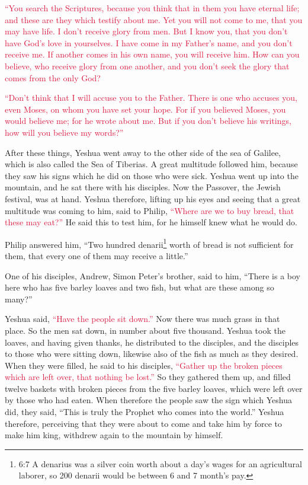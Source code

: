 \myverse{}\textcolor{crimson}{“You search the Scriptures, because you think that in them
	you have eternal life; and these are they which testify about me.
}
\myverse{}\textcolor{crimson}{Yet you will not come to me, that you may have life.
}
\myverse{}\textcolor{crimson}{I don’t receive glory from men.
}
\myverse{}\textcolor{crimson}{But I know you, that you don’t have God’s love in yourselves.
}
\myverse{}\textcolor{crimson}{I have come in my Father’s name, and you don’t receive me. If another
	comes in his own name, you will receive him.
}
\myverse{}\textcolor{crimson}{How can you believe, who receive glory from one another, and you don’t
	seek the glory that comes from the only God?}

\myverse{}\textcolor{crimson}{“Don’t think that I will accuse you to the Father. There
	is one who accuses you, even Moses, on whom you have set your hope.
}
\myverse{}\textcolor{crimson}{For if you believed Moses, you would believe me; for he wrote about me.
}
\myverse{}\textcolor{crimson}{But if you don’t believe his writings, how will you believe my words?”}


\mychapter{} \myverse*{}After these things, Yeshua went away to the other side of the sea
of Galilee, which is also called the Sea of Tiberias.
\myverse{}A great multitude followed him, because they saw his signs which he did on those
who were sick.
\myverse{}Yeshua went up into the mountain, and he sat there with his disciples.
\myverse{}Now the Passover, the Jewish festival, was at hand.
\myverse{}Yeshua therefore, lifting up his eyes and seeing that a great multitude was
coming to him, said to Philip,
\textcolor{crimson}{“Where are we to buy bread, that these may eat?”}
\myverse{}He said this to test him, for he himself knew what he would do.

\myverse{}Philip answered him, “Two hundred denarii\footnote{6:7 A denarius was a silver coin worth about a day’s wages for an agricultural laborer, so 200 denarii
	would be between 6 and 7 month’s pay.} worth of bread is not sufficient for them, that every one
of them may receive a little.”

\myverse{}One of his disciples, Andrew, Simon Peter’s brother, said to him,
\myverse{}“There is a boy here who has five barley loaves and two fish, but what are these
among so many?”

\myverse{}Yeshua said,
\textcolor{crimson}{“Have the people sit down.”} Now there was much grass in that place. So the men sat down, in number
about five thousand.
\myverse{}Yeshua took the loaves, and having given thanks, he distributed to the disciples,
and the disciples to those who were sitting down, likewise also of the fish as much as they desired.
\myverse{}When they were filled, he said to his disciples,
\textcolor{crimson}{“Gather up the broken pieces which are left over, that nothing be lost.”}
\myverse{}So they gathered them up, and filled twelve baskets with broken pieces from
the five barley loaves, which were left over by those who had eaten.
\myverse{}When therefore the people saw the sign which Yeshua did, they said, “This
is truly the Prophet who comes into the world.”
\myverse{}Yeshua therefore, perceiving that they were about to come and take him by
force to make him king, withdrew again to the mountain by himself.

